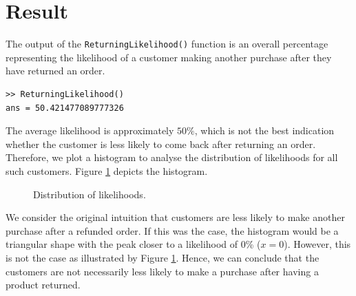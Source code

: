 \documentclass[11pt]{report}
\begin{document}
\section{Result}
The output of the \texttt{ReturningLikelihood()} function is an overall percentage representing the likelihood of a customer making another purchase after they have returned an order.

\begin{lstlisting}[title={Output of \texttt{ReturningLikelihood()}.}]
>> ReturningLikelihood()
ans = 50.421477089777326
\end{lstlisting}

The average likelihood is approximately $50\%$, which is not the best indication whether the customer is less likely to come back after returning an order. Therefore, we plot a histogram to analyse the distribution of likelihoods for all such customers. Figure \ref{fig:histogram} depicts the histogram.

\begin{figure}[h]
	\centering
	\noindent{}
  	\caption{Distribution of likelihoods.}
  	\label{fig:histogram}
\end{figure}

We consider the original intuition that customers are less likely to make another purchase after a refunded order. If this was the case, the histogram would be a triangular shape with the peak closer to a likelihood of 0\% ($x=0$). However, this is not the case as illustrated by Figure \ref{fig:histogram}. Hence, we can conclude that the customers are not necessarily less likely to make a purchase after having a product returned.
\end{document}
